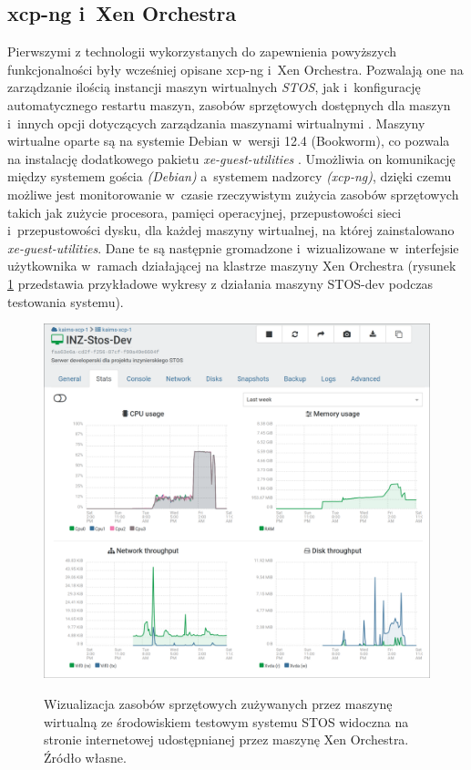 \subsection{xcp-ng i~Xen Orchestra}
Pierwszymi z technologii wykorzystanych do zapewnienia powyższych funkcjonalności były wcześniej opisane xcp-ng i~Xen Orchestra. Pozwalają one na zarządzanie ilością instancji maszyn wirtualnych \textit{STOS}, jak i~konfigurację automatycznego restartu maszyn, zasobów sprzętowych dostępnych dla maszyn i~innych opcji dotyczących zarządzania maszynami wirtualnymi \cite{xoa, xcp}. Maszyny wirtualne oparte są na systemie Debian w~wersji 12.4 (Bookworm), co pozwala na instalację dodatkowego pakietu \textit{xe-guest-utilities} \cite{xe-guest}. Umożliwia on komunikację między systemem gościa \textit{(Debian)} a~systemem nadzorcy \textit{(xcp-ng)}, dzięki czemu możliwe jest monitorowanie w~czasie rzeczywistym zużycia zasobów sprzętowych takich jak zużycie procesora, pamięci operacyjnej, przepustowości sieci i~przepustowości dysku, dla każdej maszyny wirtualnej, na której zainstalowano \textit{xe-guest-utilities}. Dane te są następnie gromadzone i~wizualizowane w~interfejsie użytkownika w~ramach działającej na klastrze maszyny Xen Orchestra (rysunek \ref{xcpGuest} przedstawia przykładowe wykresy z działania maszyny STOS-dev podczas testowania systemu).
\begin{figure}[!h]
	\begin{center}
		\resizebox{0.9\textwidth}{!} {
			\includegraphics{img/4/xe-dashboard.png}
		}
		\caption[Dashboard Xen Orchestra]{Wizualizacja zasobów sprzętowych zużywanych przez maszynę wirtualną ze środowiskiem testowym systemu STOS widoczna na stronie internetowej udostępnianej przez maszynę Xen Orchestra. Źródło własne.}
		\label{xcpGuest}
	\end{center}
\end{figure}
